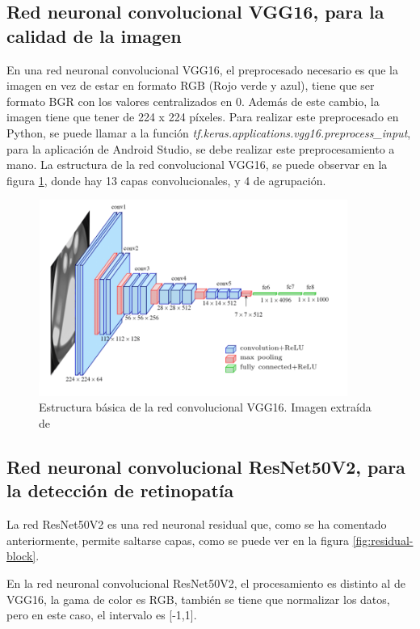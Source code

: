 \subsection{Red neuronal convolucional VGG16, para la calidad de la imagen}

En una red neuronal convolucional VGG16, el preprocesado necesario es que la imagen en vez de estar en formato RGB (Rojo verde y azul), tiene que ser formato BGR con los valores centralizados en 0. Además de este cambio, la imagen tiene que tener de 224 x 224 píxeles.
\cite{tensorflowVGG16}
Para realizar este preprocesado en Python, se puede llamar a la función \textit{tf.keras.applications.vgg16.preprocess\_input}, para la aplicación de Android Studio, se debe realizar este preprocesamiento a mano.
La estructura de la red convolucional VGG16, se puede observar en la figura \ref{fig:VGG-16-struct}, donde hay 13 capas convolucionales, y  4 de agrupación. 
\begin{figure}[!ht]
         \centering
         \includegraphics[width=0.9\textwidth]{img/VGG-16-network-architecture.png}
         \caption{Estructura básica de la red convolucional VGG16. Imagen extraída de \cite{vgg16-structure}}
         \label{fig:VGG-16-struct}
\end{figure}


\subsection{Red neuronal convolucional ResNet50V2, para la detección de retinopatía}

La red ResNet50V2 es una red neuronal residual que, como se ha comentado anteriormente, permite saltarse capas, como se puede ver en la figura \ref{fig:residual-block}.

En la red neuronal convolucional ResNet50V2, el procesamiento es distinto al de VGG16, la gama de color es RGB, también se tiene que normalizar los datos, pero en este caso, el intervalo es [-1,1]. \cite{tensorflowResNet50V2}

